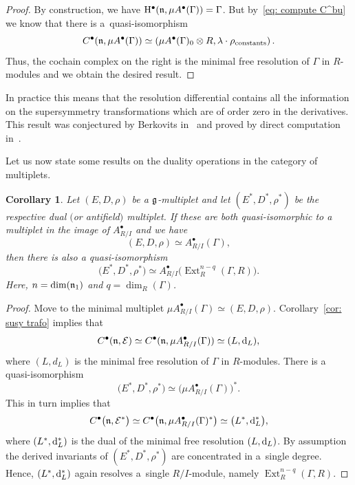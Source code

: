 \documentclass[pdftex]{sigma}
\numberwithin{equation}{section}
\newtheorem{cor}[thm]{Corollary}
\def\cE{\mathcal E}\def\cF{\mathcal F}\def\cG{\mathcal G}\def\cH{\mathcal H}
\def\bu{\bullet}
\def\d{{\rm d}}
\DeclareMathOperator{\Ext}{Ext}
\begin{document}
\begin{proof}
	By construction, we have $\mathrm H^\bullet(\fn , \mu A^\bu(\Gamma)) = \Gamma$. But by~\eqref{eq: compute C^bu} we know that there is a~quasi-isomorphism
	\begin{equation*}
	C^\bullet(\fn , \mu A^\bu(\Gamma)) \simeq \left( \mu A^\bu(\Gamma)_0 \otimes R , \lambda \cdot \rho_{\mathrm{constants}} \right) .
	\end{equation*}
	Thus, the cochain complex on the right is the minimal free resolution of $\Gamma$ in $R$-modules and we obtain the desired result.
\end{proof}

In practice this means that the resolution differential contains all the information on the supersymmetry transformations which are of order zero in the derivatives. This result was conjectured by Berkovits in~\cite{BerkovitsSupermembrane} and proved by direct computation in~\cite{perspectives}.

Let us now state some results on the duality operations in the category of multiplets.

\begin{cor}
	Let $(E,D,\rho)$ be a $\mathfrak g$-multiplet and let $(E^*, D^*, \rho^*)$ be the respective dual $($or antifield$)$ multiplet. If these are both quasi-isomorphic to a multiplet in the image of $A^\bullet_{R/I}$ and we have
	\begin{equation*}
	(E,D,\rho) \simeq A^\bullet_{R/I}(\Gamma) ,
	\end{equation*}
	then there is also a quasi-isomorphism
	\begin{equation*}
	\big(E^*, D^*,\rho^*\big) \simeq A^\bullet_{R/I}\big(\Ext_R^{n-q}(\Gamma,R)\big) .
	\end{equation*}
	Here, $n= \dim(\mathfrak n_1)$ and $q = \dim_R(\Gamma)$.
\end{cor}
\begin{proof}
	Move to the minimal multiplet $\mu A^\bullet_{R/I}(\Gamma) \simeq (E,D,\rho)$. Corollary~\ref{cor: susy trafo} implies that
	\begin{equation*}
	C^\bullet(\fn , \cE) \simeq C^\bullet(\fn , \mu A^\bullet_{R/I}(\Gamma)) \simeq (L,\d_L) ,
	\end{equation*}
	where $(L,d_L)$ is the minimal free resolution of $\Gamma$ in $R$-modules. There is a quasi-isomorphism
	\begin{equation*}
	\big(E^*,D^* ,\rho^*\big) \simeq \big(\mu A^\bullet_{R/I}(\Gamma) \big)^* .
	\end{equation*}
	This in turn implies that
	\begin{equation*}
	C^\bullet\big(\fn , \cE^*\big) \simeq C^\bullet\big(\fn , \mu A^\bullet_{R/I}(\Gamma)^* \big) \simeq \big(L^* , \d_L^*\big) ,
	\end{equation*}
	where $(L^*,\d_L^*)$ is the dual of the minimal free resolution $(L,\d_L)$. By assumption the derived invariants of $(E^*,D^*,\rho^*)$ are concentrated in a~single degree. Hence, $(L^*,\d_L^*)$ again resolves a~single $R/I$-module, namely $\Ext_R^{n-q}(\Gamma,R)$.
\end{proof}
\end{document}
